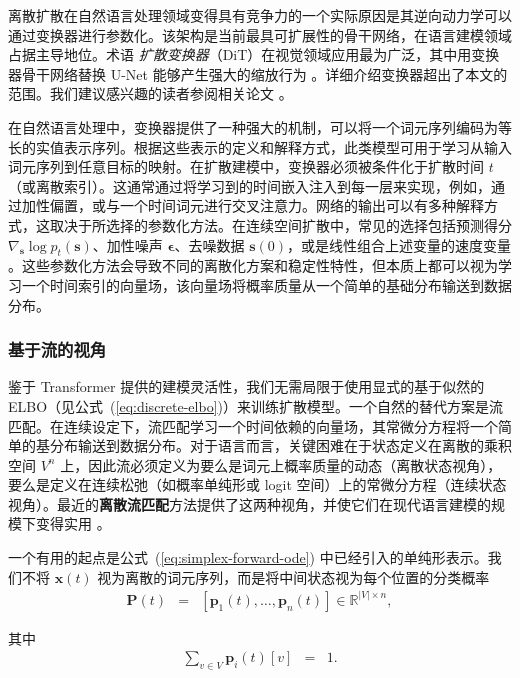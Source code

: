 \documentclass[UTF8,a4paper,zihao=-4,oneside,openany]{ctexbook}
\begin{document}
离散扩散在自然语言处理领域变得具有竞争力的一个实际原因是其逆向动力学可以通过变换器进行参数化。该架构是当前最具可扩展性的骨干网络，在语言建模领域占据主导地位。术语 \textit{扩散变换器}（DiT）在视觉领域应用最为广泛，其中用变换器骨干网络替换 U-Net 能够产生强大的缩放行为 \citep{peebles-and-xie:2023scalable}。详细介绍变换器超出了本文的范围。我们建议感兴趣的读者参阅相关论文 \citep{vaswani-etal:2017attention,xiao-and-zhu:2023introduction}。

在自然语言处理中，变换器提供了一种强大的机制，可以将一个词元序列编码为等长的实值表示序列。根据这些表示的定义和解释方式，此类模型可用于学习从输入词元序列到任意目标的映射。在扩散建模中，变换器必须被条件化于扩散时间 $t$（或离散索引）。这通常通过将学习到的时间嵌入注入到每一层来实现，例如，通过加性偏置，或与一个时间词元进行交叉注意力。网络的输出可以有多种解释方式，这取决于所选择的参数化方法。在连续空间扩散中，常见的选择包括预测得分 $\nabla_{\mathbf{s}} \log p_t(\mathbf{s})$、加性噪声 $\boldsymbol{\epsilon}$、去噪数据 $\mathbf{s}(0)$，或是线性组合上述变量的速度变量 \citep{ho-eatl:2020denoising,salimans-and-ho:2022progressive}。这些参数化方法会导致不同的离散化方案和稳定性特性，但本质上都可以视为学习一个时间索引的向量场，该向量场将概率质量从一个简单的基础分布输送到数据分布。
\subsubsection{基于流的视角}

鉴于 Transformer 提供的建模灵活性，我们无需局限于使用显式的基于似然的 ELBO（见公式~(\ref{eq:discrete-elbo})）来训练扩散模型。一个自然的替代方案是流匹配。在连续设定下，流匹配学习一个时间依赖的向量场，其常微分方程将一个简单的基分布输送到数据分布。对于语言而言，关键困难在于状态定义在离散的乘积空间 $V^n$ 上，因此流必须定义为要么是词元上概率质量的动态（离散状态视角），要么是定义在连续松弛（如概率单纯形或 logit 空间）上的常微分方程（连续状态视角）。最近的\textbf{离散流匹配}方法提供了这两种视角，并使它们在现代语言建模的规模下变得实用 \citep{gat-etal:2024discrete,campbell-etal:2024generative,shaul-etal:2025flow}。

一个有用的起点是公式~(\ref{eq:simplex-forward-ode}) 中已经引入的单纯形表示。我们不将 $\mathbf{x}(t)$ 视为离散的词元序列，而是将中间状态视为每个位置的分类概率
\begin{eqnarray}
\mathbf{P}(t) & = & [\mathbf{p}_1(t), \dots, \mathbf{p}_n(t)]
\in \mathbb{R}^{|V|\times n},
\end{eqnarray}

\noindent 其中
\begin{eqnarray}
\sum_{v\in V} \mathbf{p}_i(t)[v] & = &  1.
\end{eqnarray}
\end{document}

